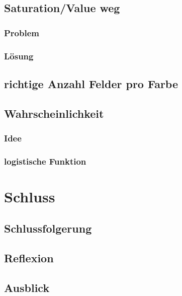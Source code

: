 \documentclass[a4paper, 12pt]{article}
\begin{document}
\subsection{Saturation/Value weg}
\subsubsection{Problem}
\subsubsection{Lösung}
\subsection{richtige Anzahl Felder pro Farbe}
\subsection{Wahrscheinlichkeit}
\subsubsection{Idee}
\subsubsection{logistische Funktion}
\section{Schluss}
\subsection{Schlussfolgerung}
\subsection{Reflexion}
\subsection{Ausblick}
\end{document}
